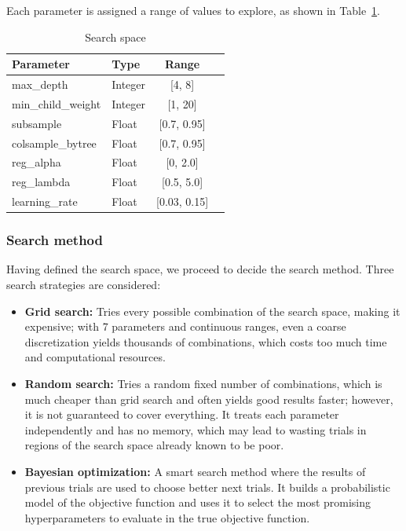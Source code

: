 Each parameter is assigned a range of values to explore, as shown in Table~\ref{tab:search_space}.
\begin{table}[H]
    \centering
    \caption{Search space}
    \label{tab:search_space}
    \begin{tabular}{|l|l|c|l|}
        \hline
        \rowcolor[gray]{0.8}\textbf{Parameter} & \textbf{Type} & \textbf{Range} \\
        \hline
        max\_depth                             & Integer       & [4, 8]         \\
        \hline
        min\_child\_weight                     & Integer       & [1, 20]        \\
        \hline
        subsample                              & Float         & [0.7, 0.95]    \\
        \hline
        colsample\_bytree                      & Float         & [0.7, 0.95]    \\
        \hline
        reg\_alpha                             & Float         & [0, 2.0]       \\
        \hline
        reg\_lambda                            & Float         & [0.5, 5.0]     \\
        \hline
        learning\_rate                         & Float         & [0.03, 0.15]   \\
        \hline
    \end{tabular}
\end{table}


\subsubsection{Search method}

Having defined the search space, we proceed to decide the search method. Three search strategies are considered:

\begin{itemize}
    \item \textbf{Grid search:} Tries every possible combination of the search space, making it expensive; with 7 parameters and continuous ranges, even a coarse discretization yields thousands of combinations, which costs too much time and computational resources.
    \item \textbf{Random search:} Tries a random fixed number of combinations, which is much cheaper than grid search and often yields good results faster; however, it is not guaranteed to cover everything. It treats each parameter independently and has no memory, which may lead to wasting trials in regions of the search space already known to be poor.
    \item \textbf{Bayesian optimization:} A smart search method where the results of previous trials are used to choose better next trials. It builds a probabilistic model of the objective function and uses it to select the most promising hyperparameters to evaluate in the true objective function.
\end{itemize}


